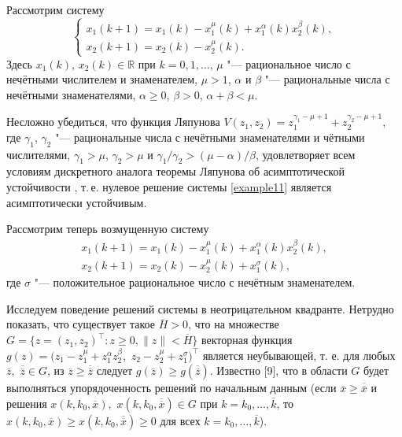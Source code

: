 \begin{example}[1]Рассмотрим систему
\begin{equation}
\begin{cases}
x_1(k+1)=x_1(k)-x_1^\mu(k)+x_1^\alpha(k) x_2^\beta(k),\\
x_2(k+1)=x_2(k)-x_2^\mu(k).\label{example11}
\end{cases}
\end{equation}
Здесь $x_1(k)$, $x_2(k)\in \mathbb R$ при $k=0, 1, \ldots$, $\mu$ "--- рациональное число
с нечётными числителем и
знаменателем, $\mu>1$, $\alpha$ и $\beta$ "--- рациональные числа с
нечётными знаменателями, $\alpha\geq 0$, $\beta>0$,
$\alpha+\beta<\mu$.

Несложно убедиться, что функция Ляпунова $ V(z_1, 
z_2)=z_1^{\gamma_1-\mu+1}+z_2^{\gamma_2-\mu+1}$, где $\gamma_1$,
$\gamma_2$ "--- рациональные числа с нечётными знаменателями и
чётными числителями, $\gamma_1>\mu$, $\gamma_2>\mu$ и
$\gamma_1/\gamma_2>(\mu-\alpha)/\beta$, удовлетворяет всем
условиям дискретного аналога теоремы Ляпунова об асимптотической
устойчивости \cite{sultan:bib8}, т.\,е. нулевое решение системы \eqref{example11}
является асимптотически устойчивым.

Рассмотрим теперь возмущенную систему
\begin{gather}
x_1(k+1)=x_1(k)-x_1^\mu(k)+x_1^\alpha(k) x_2^\beta(k),\\
x_2(k+1)=x_2(k)-x_2^\mu(k)+x_1^\sigma(k),\label{example12}
\end{gather}
где $\sigma$ "--- положительное рациональное число с нечётным
знаменателем.

Исследуем поведение решений системы в неотрицательном квадранте. \linebreak
Нетрудно показать, что существует такое $\overline{H}>0$, что на множестве
$G=\{z=(z_1,z_2)^\top :z\geq0, \|z\|<\overline{H}\}$ векторная функция
$g(z)=({z_1-z_1^\mu+z_1^\alpha z_2^\beta,} $ $ 
z_2-z_2^\mu+z_1^\sigma)^\top $ является неубывающей, т. е. для любых
$\overline{z},$ $ \overline{\overline{z}}\in G$, из
$\overline{z}\geq \overline{\overline{z}}$ следует
$g(\overline{z})\geq g(\overline{\overline{z}})$. Известно [9],
что в области $G$  будет выполняться упорядоченность решений по начальным
данным (если $\overline{x}\geq \overline{\overline{x}}$ и решения $x(k,k_0,\overline{x}),$ $ x(k,k_0,\overline{\overline{x}})\in G$ при $k=k_0,\ldots,\overline{k}$, то $x(k,k_0,
\overline{x})\geq x(k,k_0, \overline{\overline{x}})\geq0$ для всех
$k=k_0,\ldots,\overline{k}$).


\end{example}
